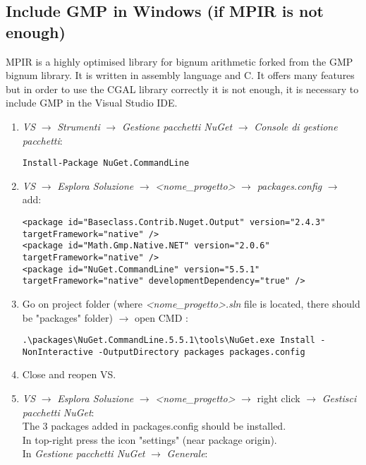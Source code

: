 \documentclass[11pt, english, openany]{report}
\begin{document}
\begin{appendices}
\begin{itemize}
\begin{table}[h]
\begin{center}
\begin{tabular}{ll|ll|ll}
		\end{tabular}
	\end{center}
\end{table}
\end{itemize}

\subsection{Include GMP in Windows (if MPIR is not enough)}
MPIR is a highly optimised library for bignum arithmetic forked from the GMP bignum library. It is written in assembly language and C. It offers many features but in order to use the CGAL library correctly it is not enough, it is necessary to include GMP in the Visual Studio IDE.
\begin{enumerate}
\item \textit{VS} $\rightarrow$ \textit{Strumenti} $\rightarrow$ \textit{Gestione pacchetti NuGet} $\rightarrow$ \textit{Console di gestione pacchetti}:
	
\begin{lstlisting}
Install-Package NuGet.CommandLine
\end{lstlisting}	

\item \textit{VS} $\rightarrow$ \textit{Esplora Soluzione} $\rightarrow$ \textit{<nome\_progetto>} $\rightarrow$ \textit{packages.config} $\rightarrow$ add: 

\begin{lstlisting}
<package id="Baseclass.Contrib.Nuget.Output" version="2.4.3" targetFramework="native" />
<package id="Math.Gmp.Native.NET" version="2.0.6" targetFramework="native" />
<package id="NuGet.CommandLine" version="5.5.1" targetFramework="native" developmentDependency="true" />
\end{lstlisting}
		

\item Go on project folder (where \textit{<nome\_progetto>.sln} file is located, there should be "packages" folder) $\rightarrow$ open CMD :

\begin{lstlisting}
.\packages\NuGet.CommandLine.5.5.1\tools\NuGet.exe Install -NonInteractive -OutputDirectory packages packages.config
\end{lstlisting}
	
\item Close and reopen VS.

\item \textit{VS} $\rightarrow$ \textit{Esplora Soluzione} $\rightarrow$ \textit{<nome\_progetto>} $\rightarrow$ right click $\rightarrow$ \textit{Gestisci pacchetti NuGet}: \\
The 3 packages added in packages.config should be installed.\\
In top-right press the icon "settings" (near package origin). \\
In \textit{Gestione pacchetti NuGet} $\rightarrow$ \textit{Generale}: \\


\end{enumerate}
\end{appendices}
\end{document}
